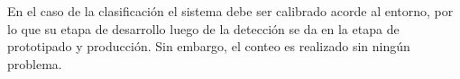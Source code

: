 En el caso de la clasificación el sistema debe ser calibrado acorde al entorno, por lo que su etapa de desarrollo luego de la detección se da en la etapa de prototipado y producción. Sin embargo, el conteo es realizado sin ningún problema.






